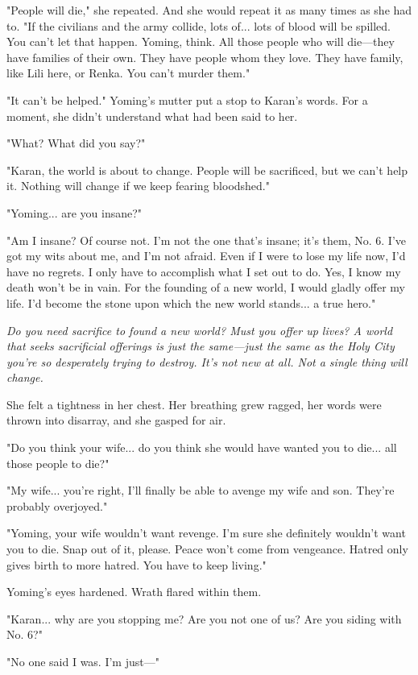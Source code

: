 "People will die," she repeated. And she would repeat it as many times
as she had to. "If the civilians and the army collide, lots of... lots
of blood will be spilled. You can't let that happen. Yoming, think. All
those people who will die---they have families of their own. They have
people whom they love. They have family, like Lili here, or Renka. You
can't murder them."

"It can't be helped." Yoming's mutter put a stop to Karan's words. For a
moment, she didn't understand what had been said to her.

"What? What did you say?"

"Karan, the world is about to change. People will be sacrificed, but we
can't help it. Nothing will change if we keep fearing bloodshed."

"Yoming... are you insane?"

"Am I insane? Of course not. I'm not the one that's insane; it's them,
No. 6. I've got my wits about me, and I'm not afraid. Even if I were to
lose my life now, I'd have no regrets. I only have to accomplish what I
set out to do. Yes, I know my death won't be in vain. For the founding
of a new world, I would gladly offer my life. I'd become the stone upon
which the new world stands... a true hero."

\emph{Do you need sacrifice to found a new world? Must you offer up lives? A
world that seeks sacrificial offerings is just the same---just the same as
the Holy City you're so desperately trying to destroy. It's not new at
all. Not a single thing will change.}

She felt a tightness in her chest. Her breathing grew ragged, her words
were thrown into disarray, and she gasped for air.

"Do you think your wife... do you think she would have wanted you to
die... all those people to die?"

"My wife... you're right, I'll finally be able to avenge my wife and
son. They're probably overjoyed."

"Yoming, your wife wouldn't want revenge. I'm sure she definitely
wouldn't want you to die. Snap out of it, please. Peace won't come from
vengeance. Hatred only gives birth to more hatred. You have to keep
living."

Yoming's eyes hardened. Wrath flared within them.

"Karan... why are you stopping me? Are you not one of us? Are you siding
with No. 6?"

"No one said I was. I'm just---"

